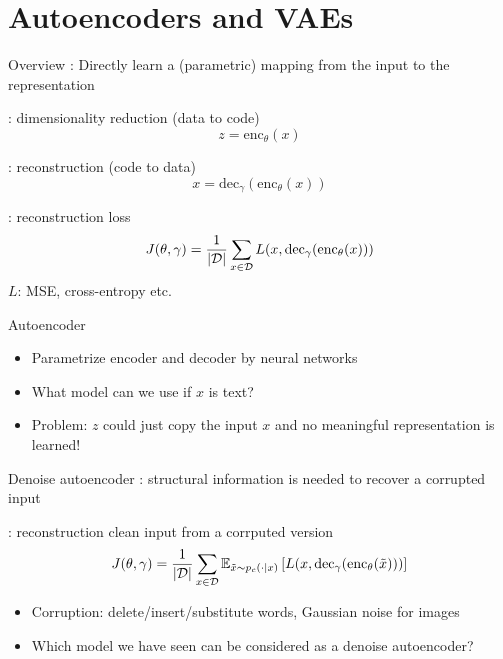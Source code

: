 \documentclass[usenames,dvipsnames,notes]{beamer}
\begin{document}
\section{Autoencoders and VAEs}

\begin{frame}
    {Overview}
    : Directly learn a (parametric) mapping from the input to the representation

    : dimensionality reduction (data to code)
    $$z = \text{enc}_\theta(x)$$

    : reconstruction (code to data)
    $$x = \text{dec}_\gamma(\text{enc}_\theta(x)) $$

    : reconstruction loss
    $$
    J(\theta, \gamma) = \frac{1}{|\mathcal{D}|}\sum_{x\in\mathcal{D}} L(x, \text{dec}_\gamma(\text{enc}_\theta(x)))
    $$
    \vspace{-1em}
    $L$: MSE, cross-entropy etc.
\end{frame}

\begin{frame}
    {Autoencoder}
    \vspace{6em}
    \begin{itemize}
        \item Parametrize encoder and decoder by neural networks
        \item What model can we use if $x$ is text?
        \item \alert{Problem}: $z$ could just copy the input $x$ and no meaningful representation is learned!
    \end{itemize}
\end{frame}

\begin{frame}
    {Denoise autoencoder}
    : structural information is needed to recover a corrupted input

    : reconstruction clean input from a corrputed version
    $$
    J(\theta, \gamma) = \frac{1}{|\mathcal{D}|}\sum_{x\in\mathcal{D}} \mathbb{E}_{\tilde{x}\sim p_c(\cdot\mid x)}\left[ L(x, \text{dec}_\gamma(\text{enc}_\theta(\tilde{x}))) \right]
    $$

    \begin{itemize}
        \item Corruption: delete/insert/substitute words, Gaussian noise for images
        \item Which model we have seen can be considered as a denoise autoencoder? 
    \end{itemize}
\end{frame}
\end{document}
